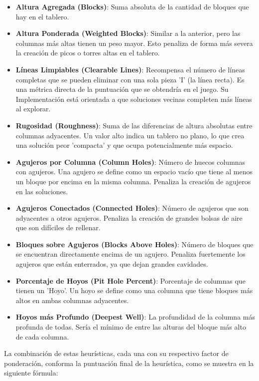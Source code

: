 \documentclass[11pt,spanish,listoffigures,listoftables]{tfgetsinf}
\begin{document}
\begin{itemize}
    \item \textbf{Altura Agregada (Blocks)}: Suma absoluta de la cantidad de bloques que hay en el tablero. 
    \item \textbf{Altura Ponderada (Weighted Blocks)}: Similar a la anterior, pero las columnas más altas tienen un peso mayor. Esto penaliza de forma más severa la creación de picos o torres altas en el tablero.
    \item \textbf{Líneas Limpiables (Clearable Lines)}: Recompensa el número de líneas completas que se pueden eliminar con una sola pieza 'I' (la línea recta). Es una métrica directa de la puntuación que se obtendría en el juego. Su Implementación está orientada a que soluciones vecinas completen más líneas al explorar.
    \item \textbf{Rugosidad (Roughness)}: Suma de las diferencias de altura absolutas entre columnas adyacentes. Un valor alto indica un tablero no plano, lo que crea una solución peor 'compacta' y que ocupa potencialmente más espacio.
    \item \textbf{Agujeros por Columna (Column Holes)}: Número de huecos columnas con agujeros. Una agujero se define como un espacio vacío que tiene al menos un bloque por encima en la misma columna. Penaliza la creación de agujeros en las soluciones.
    \item \textbf{Agujeros Conectados (Connected Holes)}: Número de agujeros que son adyacentes a otros agujeros. Penaliza la creación de grandes bolsas de aire que son difíciles de rellenar.
    \item \textbf{Bloques sobre Agujeros (Blocks Above Holes)}: Número de bloques que se encuentran directamente encima de un agujero. Penaliza fuertemente los agujeros que están enterrados, ya que dejan grandes cavidades.
    \item \textbf{Porcentaje de Hoyos (Pit Hole Percent)}: Porcentaje de columnas que tienen un 'Hoyo'. Un hoyo se define como una columna que tiene bloques más altos en ambas columnas adyacentes. 
    \item \textbf{Hoyos más Profundo (Deepest Well)}: La profundidad de la columna más profunda de todas. Sería el mínimo de entre las alturas del bloque más alto de cada columna.
\end{itemize}

La combinación de estas heurísticas, cada una con su respectivo factor de ponderación, conforma la puntuación final de la heurística, como se muestra en la siguiente fórmula:
\end{document}
